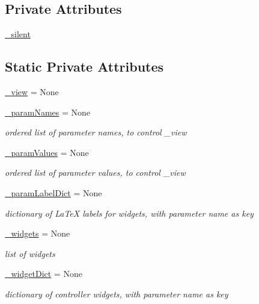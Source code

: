 \subsection*{Private Attributes}
\begin{DoxyCompactItemize}
\item 
\hyperlink{class_mu_mo_t_1_1_mu_mo_tcontroller_a909146a3c119c927727c7d533042b184}{\+\_\+silent}
\end{DoxyCompactItemize}
\subsection*{Static Private Attributes}
\begin{DoxyCompactItemize}
\item 
\hyperlink{class_mu_mo_t_1_1_mu_mo_tcontroller_a27dd8543b5188cdfe40f622d267fe2c5}{\+\_\+view} = None
\item 
\hyperlink{class_mu_mo_t_1_1_mu_mo_tcontroller_ac7734326ac8dbbf9bd0d2c9838633195}{\+\_\+param\+Names} = None
\begin{DoxyCompactList}\small\item\em ordered list of parameter names, to control \+\_\+view \end{DoxyCompactList}\item 
\hyperlink{class_mu_mo_t_1_1_mu_mo_tcontroller_a04608181fa27d9aad4983d3694f7ab17}{\+\_\+param\+Values} = None
\begin{DoxyCompactList}\small\item\em ordered list of parameter values, to control \+\_\+view \end{DoxyCompactList}\item 
\hyperlink{class_mu_mo_t_1_1_mu_mo_tcontroller_a13bcda33e0e971cf4ad2710945226add}{\+\_\+param\+Label\+Dict} = None
\begin{DoxyCompactList}\small\item\em dictionary of La\+TeX labels for widgets, with parameter name as key \end{DoxyCompactList}\item 
\hyperlink{class_mu_mo_t_1_1_mu_mo_tcontroller_a397d0ee37a222317a1bab7deb1270a13}{\+\_\+widgets} = None
\begin{DoxyCompactList}\small\item\em list of widgets \end{DoxyCompactList}\item 
\hyperlink{class_mu_mo_t_1_1_mu_mo_tcontroller_a76e960ae74fc597cd22f7132507eaa20}{\+\_\+widget\+Dict} = None
\begin{DoxyCompactList}\small\item\em dictionary of controller widgets, with parameter name as key \end{DoxyCompactList}\item 

\end{DoxyCompactItemize}
